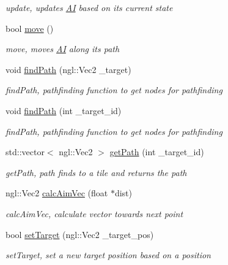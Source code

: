 \begin{DoxyCompactItemize}
\begin{DoxyCompactList}\small\item\em update, updates \hyperlink{class_a_i}{A\+I} based on its current state \end{DoxyCompactList}\item 
bool \hyperlink{class_a_i_a65e5672452841ad5a70f9f1a3222d02f}{move} ()
\begin{DoxyCompactList}\small\item\em move, moves \hyperlink{class_a_i}{A\+I} along its path \end{DoxyCompactList}\item 
void \hyperlink{class_a_i_a585e6fe1a3cd64bdf0cba371a9db9bbd}{find\+Path} (ngl\+::\+Vec2 \+\_\+target)
\begin{DoxyCompactList}\small\item\em find\+Path, pathfinding function to get nodes for pathfinding \end{DoxyCompactList}\item 
void \hyperlink{class_a_i_a8e704a8ffa258823306d7dd1ae103b1a}{find\+Path} (int \+\_\+target\+\_\+id)
\begin{DoxyCompactList}\small\item\em find\+Path, pathfinding function to get nodes for pathfinding \end{DoxyCompactList}\item 
std\+::vector$<$ ngl\+::\+Vec2 $>$ \hyperlink{class_a_i_ad7a47f053f84dc38c7c540cf4e1d8046}{get\+Path} (int \+\_\+target\+\_\+id)
\begin{DoxyCompactList}\small\item\em get\+Path, path finds to a tile and returns the path \end{DoxyCompactList}\item 
ngl\+::\+Vec2 \hyperlink{class_a_i_a3cd7d72bff6ac6336d3ac32ac65f00fb}{calc\+Aim\+Vec} (float $\ast$dist)
\begin{DoxyCompactList}\small\item\em calc\+Aim\+Vec, calculate vector towards next point \end{DoxyCompactList}\item 
bool \hyperlink{class_a_i_a43528f0cd7c1953db42b847816303a8a}{set\+Target} (ngl\+::\+Vec2 \+\_\+target\+\_\+pos)
\begin{DoxyCompactList}\small\item\em set\+Target, set a new target position based on a position \end{DoxyCompactList}\item 

\end{DoxyCompactItemize}
